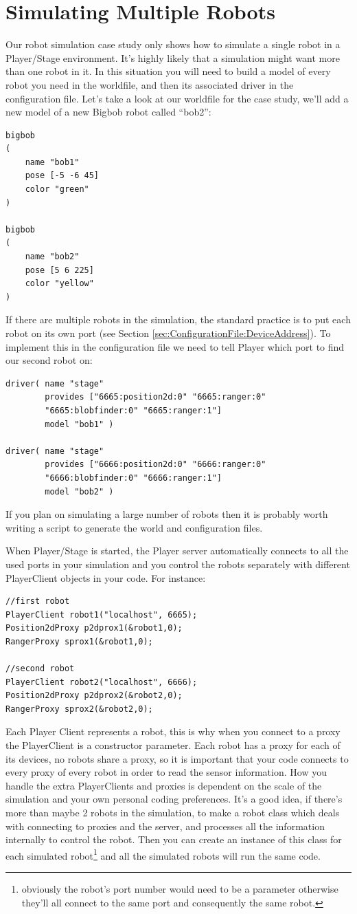 \documentclass[a4paper]{report}
\newcommand{\plst}{Player/Stage\xspace}
\newcommand{\pl}{Player\xspace}
\begin{document}
\section{Simulating Multiple Robots}
Our robot simulation case study only shows how to simulate a single robot in a \plst environment. It's highly likely that a simulation might want more than one robot in it. In this situation you will need to build a model of every robot you need in the worldfile, and then its associated driver in the configuration file. Let's take a look at our worldfile for the case study, we'll add a new model of a new Bigbob robot called ``bob2'':
\begin{verbatim}
bigbob
(
	name "bob1"
	pose [-5 -6 45]
	color "green"
)

bigbob
(
	name "bob2"
	pose [5 6 225]
	color "yellow"
)
\end{verbatim}
If there are multiple robots in the simulation, the standard practice is to put each robot on its own port (see Section \ref{sec:ConfigurationFile:DeviceAddress}). To implement this in the configuration file we need to tell \pl which port to find our second robot on:
\begin{verbatim}
driver( name "stage" 
        provides ["6665:position2d:0" "6665:ranger:0"
        "6665:blobfinder:0" "6665:ranger:1"] 
        model "bob1" )

driver( name "stage" 
        provides ["6666:position2d:0" "6666:ranger:0"
        "6666:blobfinder:0" "6666:ranger:1"] 
        model "bob2" )
\end{verbatim}
If you plan on simulating a large number of robots then it is probably worth writing a script to generate the world and configuration files.

When \plst is started, the \pl server automatically connects to all the used ports in your simulation and you control the robots separately with different PlayerClient objects in your code. For instance:
\begin{verbatim}
//first robot
PlayerClient robot1("localhost", 6665);
Position2dProxy p2dprox1(&robot1,0);
RangerProxy sprox1(&robot1,0);

//second robot
PlayerClient robot2("localhost", 6666);
Position2dProxy p2dprox2(&robot2,0);
RangerProxy sprox2(&robot2,0);
\end{verbatim}
Each \pl Client represents a robot, this is why when you connect to a proxy
the PlayerClient is a constructor parameter. Each robot has a proxy for
each of its devices, no robots share a proxy, so it is important that your
code connects to every proxy of every robot in order to read the sensor
information.
%
How you handle the extra PlayerClients and proxies is dependent on the
scale of the simulation and your own personal coding preferences. It's a
good idea, if there's more than maybe 2 robots in the simulation, to make a
robot class which deals with connecting to proxies and the server, and
processes all the information internally to control the robot. Then you can
create an instance of this class for each simulated
robot\footnote{obviously the robot's port number would need to be a
parameter otherwise they'll all connect to the same port and consequently
the same robot.} and all the simulated robots will run the same code.
\end{document}
